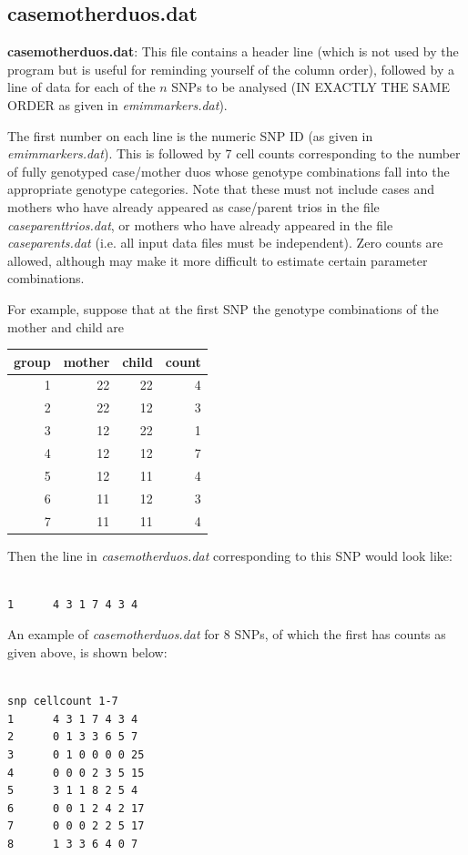 \documentclass[a4paper,12pt]{article}
\begin{document}
\subsection{casemotherduos.dat}
\label{casemotherduos}

{\bf casemotherduos.dat}: This file contains a header line (which is not used by the program but is useful for reminding yourself of the column order), followed by a line of data for each of the $n$ SNPs to be analysed (IN EXACTLY THE SAME ORDER as given in {\it emimmarkers.dat}). 

The first number on each line is the numeric SNP ID (as given in {\it emimmarkers.dat}). This is followed by 7 cell counts corresponding to the number of fully genotyped case/mother duos whose genotype combinations fall into the appropriate genotype categories. Note that these must not include cases and mothers who have already appeared as case/parent trios in the file {\it caseparenttrios.dat}, or mothers who have already appeared in the file {\it caseparents.dat} (i.e. all input data files must be independent). Zero counts are allowed, although may make it more difficult to estimate certain parameter combinations. 

For example, suppose that at the first SNP the genotype combinations of the mother and child are 

{\begin{center}\begin{tabular}{rrrr}
group  & mother  & child  & count\\
\hline
1  & 22  & 22  & 4\\
2  & 22  & 12  & 3\\
3  & 12  & 22  & 1\\
4  & 12  & 12  & 7\\
5  & 12  & 11  & 4\\
6  & 11  & 12  & 3\\
7  & 11  & 11  & 4\\
\end{tabular}\end{center}}

Then the line in {\it casemotherduos.dat} corresponding to this SNP would look like: 
\vspace{0.35cm} \begin{lstlisting}

1      4 3 1 7 4 3 4

\end{lstlisting} \vspace{0.35cm}
An example of {\it casemotherduos.dat} for 8 SNPs, of which the first has counts as given above, is shown below: 
\vspace{0.35cm} \begin{lstlisting}

snp cellcount 1-7 
1      4 3 1 7 4 3 4
2      0 1 3 3 6 5 7
3      0 1 0 0 0 0 25
4      0 0 0 2 3 5 15
5      3 1 1 8 2 5 4
6      0 0 1 2 4 2 17
7      0 0 0 2 2 5 17
8      1 3 3 6 4 0 7

\end{lstlisting} \vspace{0.35cm}
\end{document}
